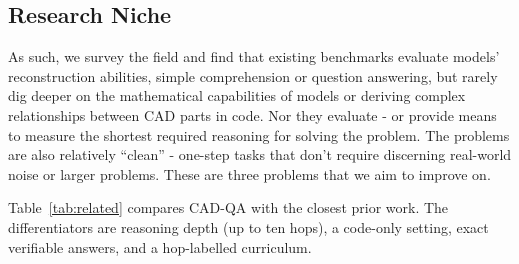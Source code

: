 \documentclass[10pt]{article}
\begin{document}
\subsection{Research Niche}

As such, we survey the field and find that existing benchmarks evaluate models' reconstruction abilities, simple comprehension or question answering, but rarely dig deeper on the mathematical capabilities of models or deriving complex relationships between CAD parts in code. Nor they evaluate - or provide means to measure the shortest required reasoning for solving the problem. The problems are also relatively ``clean'' - one-step tasks that don't require discerning real-world noise or larger problems. These are three problems that we aim to improve on.

Table~\ref{tab:related} compares CAD-QA with the closest prior work. The differentiators are reasoning depth (up to ten hops), a code-only setting, exact verifiable answers, and a hop-labelled curriculum.
\end{document}
